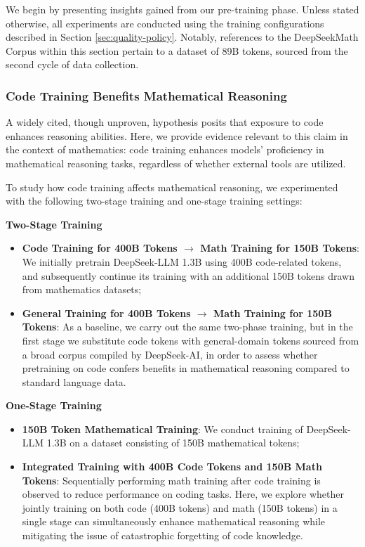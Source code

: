 \begin{itemize}[topsep=0pt]
\begin{itemize}[topsep=0pt]
We begin by presenting insights gained from our pre-training phase. Unless stated otherwise, all experiments are conducted using the training configurations described in Section \ref{sec:quality-policy}. Notably, references to the DeepSeekMath Corpus within this section pertain to a dataset of 89B tokens, sourced from the second cycle of data collection.

\subsubsection{Code Training Benefits Mathematical Reasoning}

A widely cited, though unproven, hypothesis posits that exposure to code enhances reasoning abilities. Here, we provide evidence relevant to this claim in the context of mathematics: code training enhances models' proficiency in mathematical reasoning tasks, regardless of whether external tools are utilized.

To study how code training affects mathematical reasoning, we experimented with the following two-stage training and one-stage training settings:

\textbf{Two-Stage Training}

\begin{itemize}[topsep=0pt]
    \item \textbf{Code Training for 400B Tokens $\rightarrow$ Math Training for 150B Tokens}: We initially pretrain DeepSeek-LLM 1.3B using 400B code-related tokens, and subsequently continue its training with an additional 150B tokens drawn from mathematics datasets;
    \item \textbf{General Training for 400B Tokens $\rightarrow$ Math Training for 150B Tokens}: As a baseline, we carry out the same two-phase training, but in the first stage we substitute code tokens with general-domain tokens sourced from a broad corpus compiled by DeepSeek-AI, in order to assess whether pretraining on code confers benefits in mathematical reasoning compared to standard language data.
\end{itemize}

\textbf{One-Stage Training}

\begin{itemize}[topsep=0pt]
    \item \textbf{150B Token Mathematical Training}: We conduct training of DeepSeek-LLM 1.3B on a dataset consisting of 150B mathematical tokens;
    \item \textbf{Integrated Training with 400B Code Tokens and 150B Math Tokens}: Sequentially performing math training after code training is observed to reduce performance on coding tasks. Here, we explore whether jointly training on both code (400B tokens) and math (150B tokens) in a single stage can simultaneously enhance mathematical reasoning while mitigating the issue of catastrophic forgetting of code knowledge.
\end{itemize}


\end{itemize}
\end{itemize}
